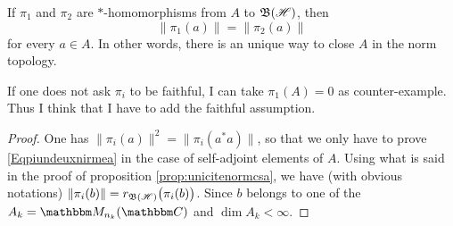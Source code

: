 \begin{lemma}
If $\pi_1$ and $\pi_2$ are $*$-homomorphisms from $A$ to $\mathfrak{B}(\mathscr{H})$, then
\begin{equation}		\label{Eqpiundeuxnirmea}
  \| \pi_1(a) \|=\| \pi_2(a) \|
\end{equation}
for every $a\in A$. In other words, there is an unique way to close $A$ in the norm topology.
\end{lemma}

\begin{probleme}
If one does not ask $\pi_i$ to be faithful, I can take $\pi_1(A)=0$ as counter-example. Thus I think that I have to add the faithful assumption.
\end{probleme}

\begin{proof}
One has $\| \pi_i(a) \|^2=\| \pi_i(a^*a) \|$, so that we only have to prove \eqref{Eqpiundeuxnirmea} in the case of self-adjoint elements of $A$. Using what is said in the proof of proposition \ref{prop:unicitenormcsa}, we have (with obvious notations) $\| \pi_i(b) \|=r_{\mathfrak{B}(\mathscr{H})}\big( \pi_i(b) \big)$. Since $b$ belongs to one of the $A_k=\eM_{n_k}(\eC)$ and $\dim A_k <\infty$.

\end{proof}

